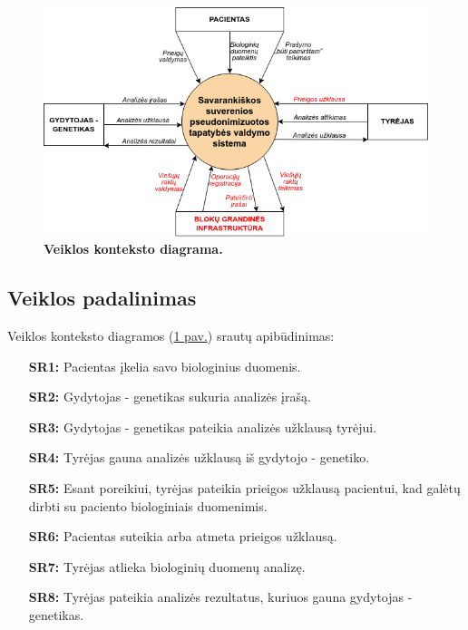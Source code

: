 \documentclass[12pt]{article}
\begin{document}
\begin{figure}[ht]
    \begin{center}
        \captionsetup{justification=centering}
        \includegraphics[width=1.0\linewidth]{Konteksto_diagrama.png}
        \vspace{-1\baselineskip}
        \caption{\small\textbf{Veiklos konteksto diagrama.}}
        \label{fig:context}
    \end{center}
\end{figure}

\subsection{Veiklos padalinimas}
Veiklos konteksto diagramos (\hyperref[fig:context]{1 pav.}) srautų
apibūdinimas:

\begin{enumerate}[itemsep=0.5pt]
    \item[\textbf{SR1:}] Pacientas įkelia savo biologinius duomenis.
    \item[\textbf{SR2:}] Gydytojas - genetikas sukuria analizės įrašą.
    \item[\textbf{SR3:}] Gydytojas - genetikas pateikia analizės užklausą
    tyrėjui.
    \item[\textbf{SR4:}] Tyrėjas gauna analizės užklausą iš gydytojo - genetiko.
    \item[\textbf{SR5:}] Esant poreikiui, tyrėjas pateikia prieigos užklausą
    pacientui, kad galėtų dirbti su paciento biologiniais duomenimis.
    \item[\textbf{SR6:}] Pacientas suteikia arba atmeta prieigos užklausą.
    \item[\textbf{SR7:}] Tyrėjas atlieka biologinių duomenų analizę.
    \item[\textbf{SR8:}] Tyrėjas pateikia analizės rezultatus, kuriuos gauna
    gydytojas - genetikas.
\end{enumerate}
\end{document}
